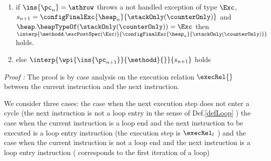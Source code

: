 \begin{lemma}
\begin{enumerate}
	 \item if $\ins{\pc_n} = \athrow $ throws a not handled exception of type $\Exc$,
	 	 $ s_{n+1} =\configFinalExc{ \heap_{n}}{  \stackOnly (\counterOnly)} $ and $\heap.\heapTypeOf(\stackOnly (\counterOnly) ) = \Exc  $ 
	 then  $\interp{\methodd.\excPostSpec( \Exc)}{\configFinalExc{ \heap_{n}}{  \stackOnly (\counterOnly)   } } $  holds.


%	
	
	
	\item else   $\interp{ \wpi{\ins{\pc_{n+1}}}{\methodd}{  } } { s_{n+1} } $  holds
\end{enumerate}
\end{lemma}

\textit{Proof :}
The proof is by case analysis on the execution relation $\execRel{}$  between the current instruction and the next instruction.

 We consider three cases: the case when the next execution step does not enter a cycle (the next instruction is not a loop entry in the sense of Def.\ref{defLoop} )
the case when the current instruction is a loop end and the next instruction to be executed is a loop entry instruction (the execution step is $\execRel_l$ )
and the case when the current instruction is not a loop end and the next instruction is a loop entry instruction ( corresponds to the first iteration of a loop) 

